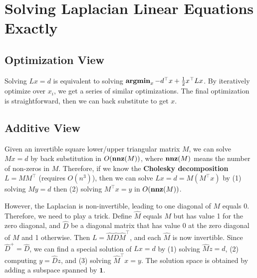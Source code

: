 \section{Solving Laplacian Linear Equations Exactly}

\subsection{Optimization View}

Solving $Lx = d$ is equivalent to solving $\operatorname{\textbf{argmin}}_x -d^\top x + \frac{1}{2} x^\top L x$. By iteratively optimize over $x_i$, we get a series of similar optimizations. The final optimization is straightforward, then we can back substitute to get $x$.

\subsection{Additive View}

Given an invertible square lower/upper triangular matrix $M$, we can solve $Mx=d$ by back substitution in $O(\operatorname{\textbf{nnz}}(M))$, where $\operatorname{\textbf{nnz}}(M)$ means the number of non-zeros in $M$. Therefore, if we know the \textbf{Cholesky decomposition} $L = M M^\top$ (requires $O(n^3)$), then we can solve $Lx =d = M (M^\top x)$ by (1) solving $M y =d$ then (2) solving $M^\top x =y$ in $O(\operatorname{\textbf{nnz}}(M))$.

However, the Laplacian is non-invertible, leading to one diagonal of $M$ equals 0. Therefore, we need to play a trick. Define $\hat{M}$ equals $M$ but has value 1 for the zero diagonal, and $\hat{D}$ be a diagonal matrix that has value 0 at the zero diagonal of $M$ and 1 otherwise. Then $L = \hat{M} \hat{D} \hat{M}^\top$, and each $\hat{M}$ is now invertible. Since $\hat{D}^+ = \hat{D}$, we can find a special solution of $Lx=d$ by (1) solving $\hat{M} z = d$, (2) computing $y = \hat{D} z$, and (3) solving $\hat{M}^\top x = y$. The solution space is obtained by adding a subspace spanned by $\boldsymbol{1}$.